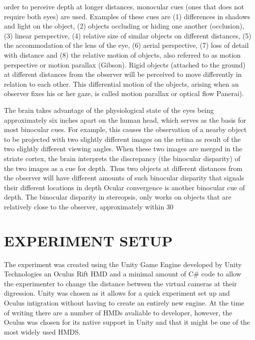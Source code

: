 \documentclass[tog]{acmsiggraph}
\begin{document}
order to perceive depth at longer distances, monocular cues (ones that does not require
both eyes) are used. Examples of these cues are (1) differences in shadows and
light on the object, (2) objects occluding or hiding one another (occlusion), (3)
linear perspective, (4) relative size of similar objects on different distances, (5) the
accommodation of the lens of the eye, (6) aerial perspective, (7) loss of detail with
distance and (8) the relative motion of objects, also referred to as motion
perspective or motion parallax (Gibson). Rigid objects (attached to the ground) at
different distances from the observer will be perceived to move differently in
relation to each other. This differential motion of the objects, arising when an
observer fixes his or her gaze, is called motion parallax or optical flow 
Panerai).

The brain takes advantage of the physiological state of the eyes being approximately six inches
apart on the human head, which serves as the basis for most binocular cues. For example, this
causes the observation of a nearby object to be projected with two slightly different images on the retina as result of the two slightly different viewing angles. When these two images are merged in the striate cortex, the brain interprets the discrepancy (the binocular disparity) of the two images as a cue for depth. Thus two objects at different distances from the observer will have different amounts of such binocular disparity that signals their different locations in depth 
Ocular convergence is another binocular cue of depth. The binocular disparity in stereopsis, only works on objects that are relatively close to the observer,
approximately within 30 



\section{EXPERIMENT SETUP}

The experiment was created using the Unity Game Engine developed by Unity Technologies an Oculus Rift HMD and a minimal amount of C\# code to allow the experimenter to change the distance between the virtual cameras at their digression. Unity was chosen as it allows for a quick experiment set up and Oculus intigration without having to create an entirely new engine.
At the time of writing there are a number of HMDs avaliable to developer, however, the Oculus was chosen for its native support in Unity and that it might be one of the most widely used HMDS.
\end{document}
